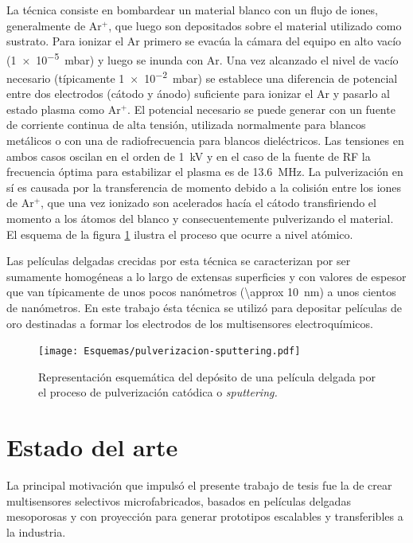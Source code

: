		La técnica consiste en bombardear un material blanco con un flujo de iones, generalmente de Ar$^+$, que luego son depositados sobre el material utilizado como sustrato. Para ionizar el Ar primero se evacúa la cámara del equipo en alto vacío (\SI{1e-5}{\milli\bar}) y luego se inunda con Ar. Una vez alcanzado el nivel de vacío necesario (típicamente \SI{1e-2}{\milli\bar}) se establece una diferencia de potencial entre dos electrodos (cátodo y ánodo) suficiente para ionizar el Ar y pasarlo al estado plasma como Ar$^{+}$. El potencial necesario se puede generar con un fuente de corriente continua de alta tensión, utilizada normalmente para blancos metálicos o con una de radiofrecuencia para blancos dieléctricos. Las tensiones en ambos casos oscilan en el orden de \SI{1}{\kilo\volt} y en el caso de la fuente de RF la frecuencia óptima para estabilizar el plasma es de \SI{13.6}{\mega\hertz}. La pulverización en sí es causada por la transferencia de momento debido a la colisión entre los iones de Ar$^+$, que una vez ionizado son acelerados hacía el cátodo transfiriendo el momento a los átomos del blanco y consecuentemente pulverizando el material. El esquema de la figura \ref{fig:sssspputt} ilustra el proceso que ocurre a nivel atómico. \cite{Behrisch1981,sigmund1968,Bhatt2007}
	
		Las películas delgadas crecidas por esta técnica se caracterizan por ser sumamente homogéneas a lo largo de extensas superficies y con valores de espesor que van típicamente de unos pocos nanómetros (\SI{\approx 10}{\nm}) a unos cientos de nanómetros. En este trabajo ésta técnica se utilizó para depositar películas de oro destinadas a formar los electrodos de los multisensores electroquímicos.

				\begin{figure}[h!]
 				\begin{center}
 				\texttt{[image: Esquemas/pulverizacion-sputtering.pdf]}
 				\caption[Etapas del proceso de pulverización catódica]{Representación esquemática del depósito de una película delgada por el proceso de pulverización catódica o \textit{sputtering.}}
 		   		\label{fig:sssspputt}
 		    	\end{center}
 		    	\end{figure}			

\section{Estado del arte}
	 		    		
	La principal motivación que impulsó el presente trabajo de tesis fue la de crear multisensores selectivos microfabricados, basados en películas delgadas mesoporosas y con proyección para generar prototipos escalables y transferibles a la industria. 

